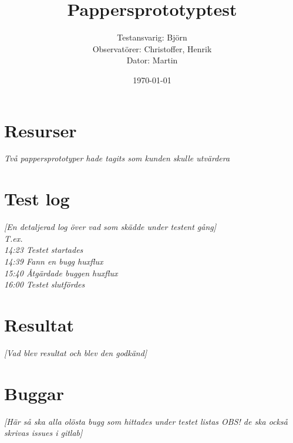 \documentclass[a4paper,10pt]{article}
\title{Pappersprototyptest}
\author{Testansvarig: Björn\\Observatörer: Christoffer, Henrik\\ Dator: Martin}
\date{\today}
\begin{document}
\maketitle\clearpage

\section{Resurser}
\emph{Två pappersprototyper hade tagits som kunden skulle utvärdera}

\section{Test log}
\emph{[En detaljerad log över vad som skädde under testent gång]\\
T.ex. \\ 14:23 Testet startades \\ 14:39 Fann en bugg huxflux \\ 15:40 Åtgärdade buggen huxflux \\ 16:00 Testet slutfördes}
\

\section{Resultat}
\emph{[Vad blev resultat och blev den godkänd]}

\section{Buggar}
\emph{[Här så ska alla olösta bugg som hittades under testet listas OBS! de ska också skrivas issues i gitlab]}
\end{document}
